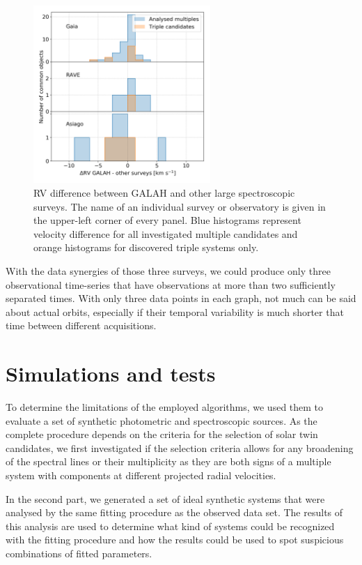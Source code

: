 \begin{figure}
	\centering
	\includegraphics[width=0.6\textwidth]{guess_all_rv_diff.png}
	\caption{RV difference between GALAH and other large spectroscopic surveys. The name of an individual survey or observatory is given in the upper-left corner of every panel. Blue histograms represent velocity difference for all investigated multiple candidates and orange histograms for discovered triple systems only.}
	\label{fig:rv_survey}
\end{figure}

With the data synergies of those three surveys, we could produce only three observational time-series that have observations at more than two sufficiently separated times. With only three data points in each graph, not much can be said about actual orbits, especially if their temporal variability is much shorter that time between different acquisitions.

\section{Simulations and tests}
\label{sec:simulations}
To determine the limitations of the employed algorithms, we used them to evaluate a set of synthetic photometric and spectroscopic sources. As the complete procedure depends on the criteria for the selection of solar twin candidates, we first investigated if the selection criteria allows for any broadening of the spectral lines or their multiplicity as they are both signs of a multiple system with components at different projected radial velocities.

In the second part, we generated a set of ideal synthetic systems that were analysed by the same fitting procedure as the observed data set. The results of this analysis are used to determine what kind of systems could be recognized with the fitting procedure and how the results could be used to spot suspicious combinations of fitted parameters. 

